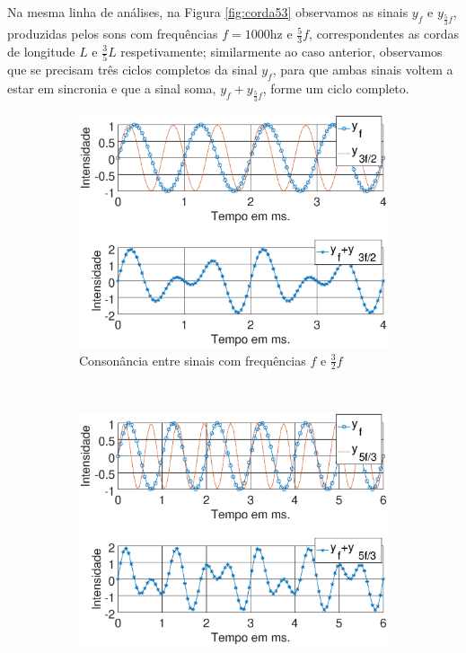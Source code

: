 Na mesma linha de análises, na Figura \ref{fig:corda53} observamos as sinais $y_{f}$ e $y_{\frac{5}{3}f}$, 
produzidas pelos sons com frequências $f=1000$hz e $\frac{5}{3}f$,
correspondentes as cordas de longitude $L$ e $\frac{3}{5}L$ respetivamente;
similarmente ao caso anterior, observamos que se precisam três ciclos completos da sinal $y_{f}$,
para que ambas sinais voltem a estar em sincronia e que a sinal soma, $y_{f}+y_{\frac{5}{3}f}$, forme um ciclo completo.

\begin{figure}
    \centering
    \begin{subfigure}[b]{0.8\textwidth}
        \includegraphics[width=\textwidth]{chapters/cap-musica-composer/consonancia32.eps}
        \caption{Consonância entre sinais com frequências $f$ e $\frac{3}{2}f$}
        \label{fig:corda32}
    \end{subfigure}
    ~ %
    \begin{subfigure}[b]{0.8\textwidth}
        \includegraphics[width=\textwidth]{chapters/cap-musica-composer/consonancia53.eps}

\end{subfigure}
\end{figure}
